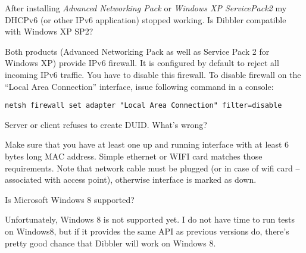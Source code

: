 \Q After installing \emph{Advanced Networking Pack} or \emph{Windows XP
  ServicePack2} my DHCPv6 (or other IPv6 application) stopped
working. Is Dibbler compatible with Windows XP SP2?

\A Both products (Advanced Networking Pack as well as Service Pack 2
for Windows XP) provide IPv6 firewall. It is configured by default to
reject all incoming IPv6 traffic. You have to disable this
firewall. To disable firewall on the ``Local Area Connection''
interface, issue following command in a console:

\begin{lstlisting}
netsh firewall set adapter "Local Area Connection" filter=disable
\end{lstlisting}

\Q Server or client refuses to create DUID. What's wrong?

\A Make sure that you have at least one up and running interface with
at least 6 bytes long MAC address. Simple ethernet or WIFI card
matches those requirements. Note that network cable must be plugged
(or in case of wifi card -- associated with access point), otherwise
interface is marked as down.

\Q Is Microsoft Windows 8 supported?

\A Unfortunately, Windows 8 is not supported yet. I do not have time
to run tests on Windows8, but if it provides the same API as previous
versions do, there's pretty good chance that Dibbler will work on
Windows 8.
